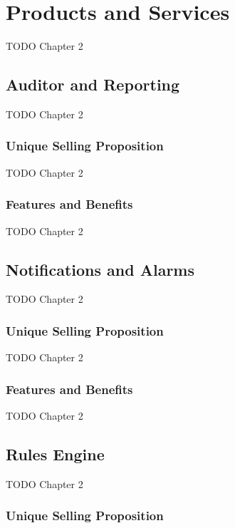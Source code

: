 
\section{Products and Services}
TODO Chapter 2


\subsection{Auditor and Reporting}
TODO Chapter 2

\subsubsection*{Unique Selling Proposition}
TODO Chapter 2

\subsubsection*{Features and Benefits}
TODO Chapter 2


\subsection{Notifications and Alarms}
TODO Chapter 2

\subsubsection*{Unique Selling Proposition}
TODO Chapter 2

\subsubsection*{Features and Benefits}
TODO Chapter 2


\subsection{Rules Engine}
TODO Chapter 2

\subsubsection*{Unique Selling Proposition}

